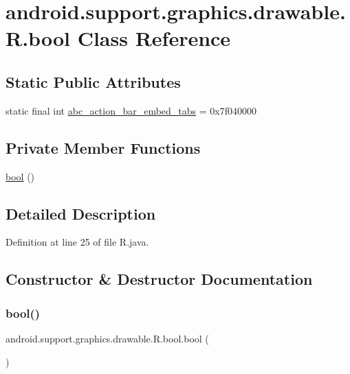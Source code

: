 \hypertarget{classandroid_1_1support_1_1graphics_1_1drawable_1_1_r_1_1bool}{}\section{android.\+support.\+graphics.\+drawable.\+R.\+bool Class Reference}
\label{classandroid_1_1support_1_1graphics_1_1drawable_1_1_r_1_1bool}
\subsection*{Static Public Attributes}
\begin{DoxyCompactItemize}
\item 
static final int \mbox{\hyperlink{classandroid_1_1support_1_1graphics_1_1drawable_1_1_r_1_1bool_a7458f074ec76e2f07e8e86a776e918a4}{abc\+\_\+action\+\_\+bar\+\_\+embed\+\_\+tabs}} = 0x7f040000
\end{DoxyCompactItemize}
\subsection*{Private Member Functions}
\begin{DoxyCompactItemize}
\item 
\mbox{\hyperlink{classandroid_1_1support_1_1graphics_1_1drawable_1_1_r_1_1bool_a3c3f8a6ba32d897ea456dc53459417b9}{bool}} ()
\end{DoxyCompactItemize}


\subsection{Detailed Description}


Definition at line 25 of file R.\+java.



\subsection{Constructor \& Destructor Documentation}
\mbox{\label{classandroid_1_1support_1_1graphics_1_1drawable_1_1_r_1_1bool_a3c3f8a6ba32d897ea456dc53459417b9}} 
\subsubsection{\texorpdfstring{bool()}{bool()}}
{\footnotesize\ttfamily android.\+support.\+graphics.\+drawable.\+R.\+bool.\+bool (\begin{DoxyParamCaption}{ }\end{DoxyParamCaption})\hspace{0.3cm}{\ttfamily [private]}}



